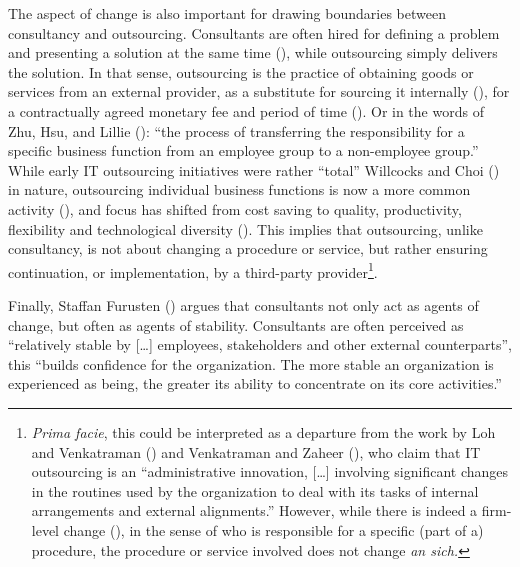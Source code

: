 \documentclass[
  man,floatsintext]{apa6}
\begin{document}
The aspect of change is also important for drawing boundaries between consultancy and outsourcing. Consultants are often hired for defining a problem and presenting a solution at the same time (), while outsourcing simply delivers the solution. In that sense, outsourcing is the practice of obtaining goods or services from an external provider, as a substitute for sourcing it internally (), for a contractually agreed monetary fee and period of time (). Or in the words of Zhu, Hsu, and Lillie (): ``the process of transferring the responsibility for a specific business function from an employee group to a non-employee group.'' While early IT outsourcing initiatives were rather ``total'' Willcocks and Choi () in nature, outsourcing individual business functions is now a more common activity (), and focus has shifted from cost saving to quality, productivity, flexibility and technological diversity (). This implies that outsourcing, unlike consultancy, is not about changing a procedure or service, but rather ensuring continuation, or implementation, by a third-party provider\footnote{\emph{Prima facie}, this could be interpreted as a departure from the work by Loh and Venkatraman () and Venkatraman and Zaheer (), who claim that IT outsourcing is an ``administrative innovation, {[}\ldots{]} involving significant changes in the routines used by the organization to deal with its tasks of internal arrangements and external alignments.'' However, while there is indeed a firm-level change (), in the sense of who is responsible for a specific (part of a) procedure, the procedure or service involved does not change \emph{an sich.}}.

Finally, Staffan Furusten () argues that consultants not only act as agents of change, but often as agents of stability. Consultants are often perceived as ``relatively stable by {[}\ldots{]} employees, stakeholders and other external counterparts'', this ``builds confidence for the organization. The more stable an organization is experienced as being, the greater its ability to concentrate on its core activities.''
\end{document}
